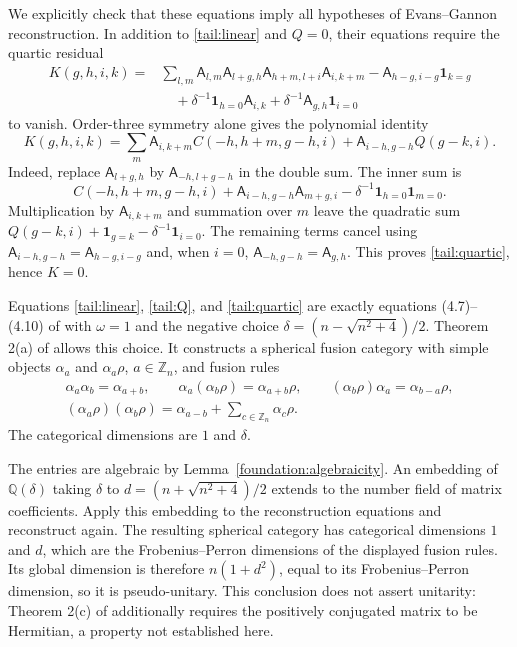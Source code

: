 \documentclass[11pt]{article}
\numberwithin{equation}{section}
\theoremstyle{definition}
\theoremstyle{remark}
\begin{document}
We explicitly check that these equations imply all hypotheses
of Evans--Gannon reconstruction.  In addition to
\eqref{tail:linear} and $Q=0$, their equations require the
quartic residual
\begin{align*}
 K(g,h,i,k)={}&\sum_{l,m}\mathsf A_{l,m}\mathsf A_{l+g,h}
                  \mathsf A_{h+m,l+i}\mathsf A_{i,k+m}
       -\mathsf A_{h-g,i-g}\mathbf1_{k=g}\\
 &\quad+\delta^{-1}\mathbf1_{h=0}\mathsf A_{i,k}
       +\delta^{-1}\mathsf A_{g,h}\mathbf1_{i=0}
\end{align*}
to vanish.  Order-three symmetry alone gives the polynomial identity
\begin{equation}\label{tail:quartic}
 K(g,h,i,k)=\sum_m\mathsf A_{i,k+m}
                          C(-h,h+m,g-h,i)
                  +\mathsf A_{i-h,g-h}Q(g-k,i).
\end{equation}
Indeed, replace $\mathsf A_{l+g,h}$ by
$\mathsf A_{-h,l+g-h}$ in the double sum.  The inner sum is
\[
 C(-h,h+m,g-h,i)+\mathsf A_{i-h,g-h}\mathsf A_{m+g,i}
                       -\delta^{-1}\mathbf1_{h=0}\mathbf1_{m=0}.
\]
Multiplication by $\mathsf A_{i,k+m}$ and summation over $m$
leave the quadratic sum
$Q(g-k,i)+\mathbf1_{g=k}-\delta^{-1}\mathbf1_{i=0}$.
The remaining terms cancel using
$\mathsf A_{i-h,g-h}=\mathsf A_{h-g,i-g}$ and, when $i=0$,
$\mathsf A_{-h,g-h}=\mathsf A_{g,h}$.  This proves
\eqref{tail:quartic}, hence $K=0$.

Equations \eqref{tail:linear}, \eqref{tail:Q}, and
\eqref{tail:quartic} are exactly equations (4.7)--(4.10) of
\cite{EG} with $\omega=1$ and the negative choice
$\delta=(n-\sqrt{n^2+4})/2$.  Theorem 2(a) of \cite{EG}
allows this choice.  It constructs a spherical fusion category
with simple objects $\alpha_a$ and $\alpha_a\rho$, $a\in\mathbb Z_n$,
and fusion rules
\begin{gather*}
 \alpha_a\alpha_b=\alpha_{a+b},\qquad
 \alpha_a(\alpha_b\rho)=\alpha_{a+b}\rho,
 \qquad (\alpha_b\rho)\alpha_a=\alpha_{b-a}\rho,\\
 (\alpha_a\rho)(\alpha_b\rho)
      =\alpha_{a-b}+\sum_{c\in\mathbb Z_n}\alpha_c\rho.
\end{gather*}
The categorical dimensions are $1$ and $\delta$.

The entries are algebraic by Lemma~\ref{foundation:algebraicity}.  An
embedding of $\mathbb Q(\delta)$ taking $\delta$ to
$d=(n+\sqrt{n^2+4})/2$ extends to the number field of matrix
coefficients.  Apply this embedding to the reconstruction
equations and reconstruct again.  The resulting spherical
category has categorical dimensions $1$ and $d$, which are
the Frobenius--Perron dimensions of the displayed fusion rules.
Its global dimension is therefore $n(1+d^2)$, equal to its
Frobenius--Perron dimension, so it is pseudo-unitary.
This conclusion does not assert unitarity: Theorem 2(c) of
\cite{EG} additionally requires the positively conjugated
matrix to be Hermitian, a property not established here.
\end{document}
